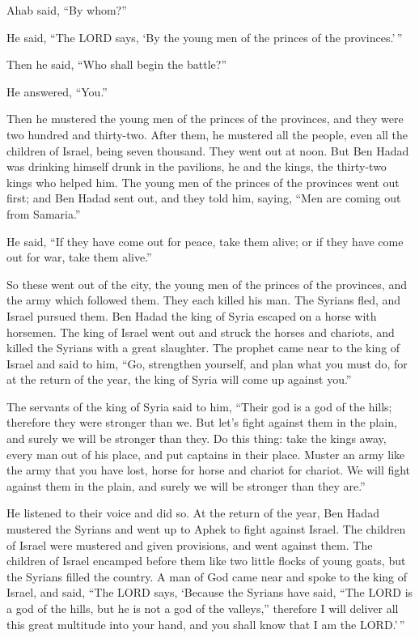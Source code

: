  Ahab said, ``By whom?''

He said, ``The LORD says, `By the young men of the princes of the
provinces.'\,''

Then he said, ``Who shall begin the battle?''

He answered, ``You.''

 Then he mustered the young men of the princes of the
provinces, and they were two hundred and thirty-two. After them, he
mustered all the people, even all the children of Israel, being seven
thousand.  They went out at noon. But Ben Hadad was
drinking himself drunk in the pavilions, he and the kings, the
thirty-two kings who helped him.  The young men of the
princes of the provinces went out first; and Ben Hadad sent out, and
they told him, saying, ``Men are coming out from Samaria.''

 He said, ``If they have come out for peace, take them
alive; or if they have come out for war, take them alive.''

 So these went out of the city, the young men of the
princes of the provinces, and the army which followed them.
 They each killed his man. The Syrians fled, and Israel
pursued them. Ben Hadad the king of Syria escaped on a horse with
horsemen.  The king of Israel went out and struck the
horses and chariots, and killed the Syrians with a great slaughter.
 The prophet came near to the king of Israel and said to
him, ``Go, strengthen yourself, and plan what you must do, for at the
return of the year, the king of Syria will come up against you.''

 The servants of the king of Syria said to him, ``Their god
is a god of the hills; therefore they were stronger than we. But let's
fight against them in the plain, and surely we will be stronger than
they.  Do this thing: take the kings away, every man out of
his place, and put captains in their place.  Muster an army
like the army that you have lost, horse for horse and chariot for
chariot. We will fight against them in the plain, and surely we will be
stronger than they are.''

He listened to their voice and did so.  At the return of
the year, Ben Hadad mustered the Syrians and went up to Aphek to fight
against Israel.  The children of Israel were mustered and
given provisions, and went against them. The children of Israel encamped
before them like two little flocks of young goats, but the Syrians
filled the country.  A man of God came near and spoke to
the king of Israel, and said, ``The LORD says, `Because the Syrians have
said, ``The LORD is a god of the hills, but he is not a god of the
valleys,'' therefore I will deliver all this great multitude into your
hand, and you shall know that I am the LORD.'\,''

